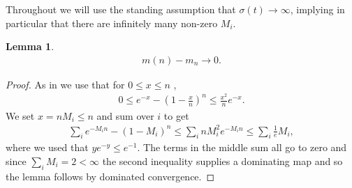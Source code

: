 \documentclass[12pt]{article}
\theoremstyle{definition}
\newtheorem{lemma}[proposition]{Lemma}
\begin{document}
Throughout we will use the standing assumption that $\sigma(t) \rightarrow \infty$, implying in particular that there are infinitely many non-zero $M_i$.

\begin{lemma} \label{lem: D-1}
    \begin{align*}
        m(n)-m_n \rightarrow 0.
    \end{align*}
\end{lemma}
\begin{proof} As in \cite{dutko_1989_central} we use that for $0 \leq x \leq n$ ,
    \begin{align*}
        0 \leq e^{-x}-\left(1-\frac{x}{n}\right)^n \leq \frac{x^2}{n}e^{-x}.
    \end{align*}
We set $x = nM_i \leq n$ and sum over $i$ to get
\begin{align*}
\sum_i e^{-M_in}-(1-M_i)^n \leq \sum_i nM_i^2e^{-M_in} \leq 
\sum_i \frac{1}{e} M_i, \end{align*}
where we used that $ye^{-y} \leq e^{-1}$. The terms in the middle sum all go to zero and since $\sum_i M_i =2 < \infty$ the second inequality supplies a dominating map and so the lemma follows by dominated convergence.
\end{proof}
\end{document}
